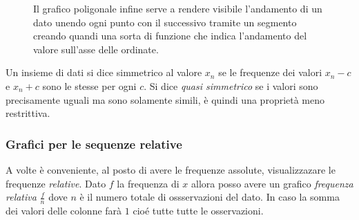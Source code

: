 \documentclass{article}
\begin{document}
\begin{figure}[h]
    \begin{minipage}{0.35\textwidth} %
    \end{minipage}
    \hfill
    \begin{minipage}{0.6\textwidth} %
      Il grafico poligonale infine serve a rendere visibile l'andamento di un dato unendo ogni punto con il successivo tramite un segmento creando quandi una sorta di funzione che indica l'andamento del valore sull'asse delle ordinate.    
    \end{minipage}
\end{figure}

Un insieme di dati si dice simmetrico al valore $x_n$ se le frequenze dei valori $x_n-c$ e $x_n+c$ sono le stesse per ogni $c$. Si dice \textit{quasi simmetrico} se i valori sono precisamente uguali ma sono solamente simili, è quindi una proprietà meno restrittiva.

\subsubsection*{Grafici per le sequenze relative}

A volte è conveniente, al posto di avere le frequenze assolute, visualizzazare le frequenze \textit{relative}. Dato $f$ la frequenza di $x$ allora posso avere un grafico \textit{frequenza relativa} $\frac{f}{n}$ dove $n$ è il numero totale di ossservazioni del dato. In caso la somma dei valori delle colonne farà $1$ cioé tutte tutte le osservazioni.
\end{document}
